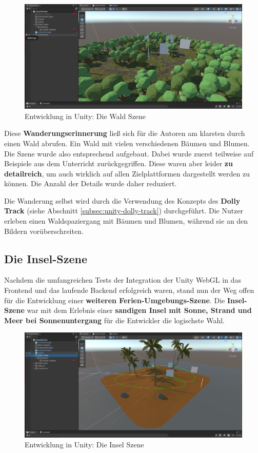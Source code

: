 \begin{figure} [h t]
    \centering
    \includegraphics[scale=0.15]{pics/unity-edit-forest.png}
    \caption{Entwicklung in Unity: Die Wald Szene}
    \label{fig:unity-edit-forest}
\end{figure}


Diese \textbf{Wanderungserinnerung} ließ sich für die Autoren am klarsten durch einen Wald abrufen. Ein Wald mit vielen verschiedenen Bäumen und Blumen. Die Szene wurde also entsprechend aufgebaut. Dabei wurde zuerst teilweise auf Beispiele aus dem Unterricht zurückgegriffen. Diese waren aber leider \textbf{zu detailreich}, um auch wirklich auf allen Zielplattformen dargestellt werden zu können. Die Anzahl der Details wurde daher reduziert.

Die Wanderung selbst wird durch die Verwendung des Konzepts des \textbf{Dolly Track} (siehe Abschnitt \ref{subsec:unity-dolly-track}) durchgeführt. Die Nutzer erleben einen Waldspaziergang mit Bäumen und Blumen, während sie an den Bildern vorüberschreiten.


\subsection{Die Insel-Szene}

Nachdem die umfangreichen Tests der Integration der Unity WebGL in das Frontend und das laufende Backend erfolgreich waren, stand nun der Weg offen für die Entwicklung einer \textbf{weiteren Ferien-Umgebungs-Szene}. Die \textbf{Insel-Szene} war mit dem Erlebnis einer \textbf{sandigen Insel mit Sonne, Strand und Meer bei Sonnenuntergang} für die Entwickler die logischste Wahl.   


\begin{figure} [h t]
    \centering
    \includegraphics[scale=0.15]{pics/unity-edit-island.png}
    \caption{Entwicklung in Unity: Die Insel Szene}
    \label{fig:unity-edit-island}
\end{figure}


